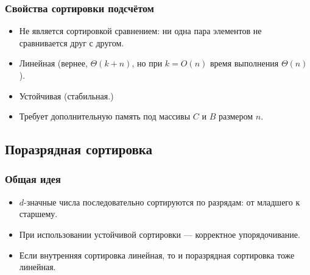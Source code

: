 \documentclass[hyperref={unicode=true}]{beamer}
\begin{document}
\frame
{
  \frametitle{Свойства сортировки подсчётом}
  \begin{itemize}
    \item Не является сортировкой сравнением: ни одна пара элементов
      не сравнивается друг с другом. 
    \item Линейная (вернее, $\Theta(k+n)$, но при $k=O(n)$ время
      выполнения $\Theta(n)$).
    \item Устойчивая (стабильная.) 
    \item Требует дополнительную память под массивы $C$ и $B$ размером $n$. 
  \end{itemize}
}


\subsection{Поразрядная сортировка}
\frame
{
  \frametitle{Общая идея}
  \begin{itemize}
    \item $d$-значные числа последовательно сортируются по разрядам: от младшего к
      старшему. 
    \item При использовании устойчивой сортировки --- корректное
      упорядочивание. 
    \item Если внутренняя сортировка линейная, то и поразрядная
      сортировка тоже линейная.
  \end{itemize}
}
\frame
\end{document}

